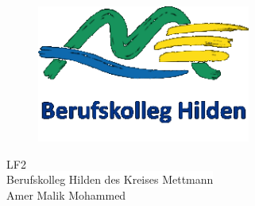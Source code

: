 
\begin{figure}[!htb]
    \centering
    \includegraphics[width=7cm]{logo-3}\label{fig:figure}
\end{figure}

\begin{center}
    \color{white}\Huge{\colorbox{BurntOrange}{\fbseries  LF2}}
    \vspace{5mm}
    \\ \color{black}\small{\colorbox{white}{\fbseries Berufskolleg Hilden des Kreises Mettmann}}
    \vspace{5mm}
    \\  \color{white}\Huge{\colorbox{BurntOrange}{Amer Malik Mohammed}}
\end{center}

